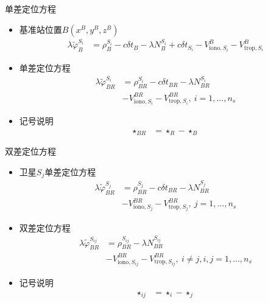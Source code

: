 \begin{frame}{单差定位方程}
    \begin{itemize}
        \item 基准站位置$B\left( x ^ B, y ^ B, z ^ B \right)$
        \begin{align*}
            \lambda \tilde \varphi _ B ^ { S _ i } &= \rho _ B ^ { S _ i } - c \delta t _ B - \lambda N _ B ^ { S _ i }
            + c \delta t _ { S _ i } - V _ { \mathrm{ iono }, S _ i } ^ B - V _ { \mathrm{ trop }, S _ i } ^ B
        \end{align*}
        \item 单差定位方程
        \begin{align*}
            \lambda \tilde \varphi _ { BR } ^ { S _ i } &= \rho _ { BR } ^ { S _ i } - c \delta t _ { BR } - \lambda N _ { BR } ^ { S _ i } \\
            &- V _ { \mathrm{ iono }, S _ i } ^ { BR } - V _ { \mathrm{ trop }, S _ i } ^ { BR }, \ i = 1, \ldots, n _ s
        \end{align*}
        \item 记号说明
        \begin{align*}
            \star _ { BR } &= \star _ R - \star _ B
        \end{align*}
    \end{itemize}
\end{frame}

\begin{frame}{双差定位方程}
    \begin{itemize}
        \item 卫星$S _ j$单差定位方程
        \begin{align*}
            \lambda \tilde \varphi _ { BR } ^ { S _ j } &= \rho _ { BR } ^ { S _ j } - c \delta t _ { BR } - \lambda N _ { BR } ^ { S _ j } \\
            &- V _ { \mathrm{ iono }, S _ j } ^ { BR } - V _ { \mathrm{ trop }, S _ j } ^ { BR }, \ j = 1, \ldots, n _ s
        \end{align*}
        \item 双差定位方程
        \begin{align*}
            \lambda \tilde \varphi _ { BR } ^ { S _ { ij } } &= \rho _ { BR } ^ { S _ { ij } } - \lambda N _ { BR } ^ { S _ { ij } } \\
            &- V _ { \mathrm{ iono }, S _ { ij } } ^ { BR } - V _ { \mathrm{ trop }, S _ { ij } } ^ { BR }, \ i \ne j, i, j = 1, \ldots, n _ s
        \end{align*}
        \item 记号说明
        \begin{align*}
            \star _ { ij } &= \star _ i - \star _ j
        \end{align*}
    \end{itemize}
\end{frame}

